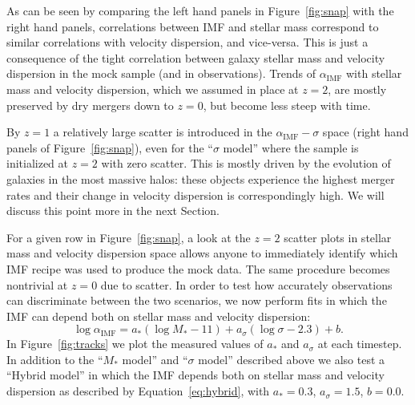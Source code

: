 \documentclass[usenatbib, letters]{mnras}
\def\aimf{\alpha_{\mathrm{IMF}}}
\def\Fref#1{Figure~\ref{#1}\xspace}
\def\Eref#1{Equation~\ref{#1}\xspace}
\begin{document}
As can be seen by comparing the left hand panels in \Fref{fig:snap} with the right hand panels, correlations between IMF and stellar mass correspond to similar correlations with velocity dispersion, and vice-versa. This is just a consequence of the tight correlation between galaxy stellar mass and velocity dispersion in the mock sample (and in observations). 
Trends of $\aimf$ with stellar mass and velocity dispersion, which we assumed in place at $z=2$, are mostly preserved by dry mergers down to $z=0$, but become less steep with time.

By $z=1$ a relatively large scatter is introduced in the $\aimf-\sigma$ space (right hand panels of \Fref{fig:snap}), even for the ``$\sigma$ model'' where the sample is initialized at $z=2$ with zero scatter. This is mostly driven by the evolution of galaxies in the most massive halos: these objects experience the highest merger rates and their change in velocity dispersion is correspondingly high. We will discuss this point more in the next Section.

For a given row in \Fref{fig:snap}, a look at the $z=2$ scatter plots in stellar mass and velocity dispersion space allows anyone to immediately identify which IMF recipe was used to produce the mock data.
The same procedure becomes nontrivial at $z=0$ due to scatter.
In order to test how accurately observations can discriminate between the two scenarios, we now perform fits in which the IMF can depend both on stellar mass and velocity dispersion:
\begin{equation}\label{eq:hybrid}
\log{\aimf} = a_*(\log{M_*} - 11) + a_\sigma(\log{\sigma} - 2.3) + b.
\end{equation}
In \Fref{fig:tracks} we plot the measured values of $a_*$ and $a_\sigma$ at each timestep.
In addition to the ``$M_*$ model'' and ``$\sigma$ model'' described above we also test a ``Hybrid model'' in which the IMF depends both on stellar mass and velocity dispersion as described by \Eref{eq:hybrid}, 
with $a_*=0.3$, $a_\sigma=1.5$, $b=0.0$.



\end{document}
